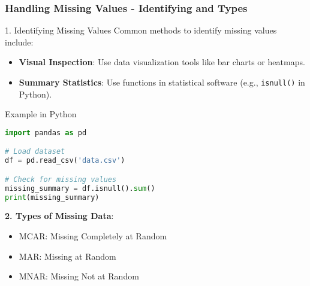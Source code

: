\documentclass[aspectratio=169]{beamer}
\begin{document}
\begin{frame}
    \frametitle{Handling Missing Values - Identifying and Types}
    \begin{block}{1. Identifying Missing Values}
        Common methods to identify missing values include:
        \begin{itemize}
            \item \textbf{Visual Inspection}: Use data visualization tools like bar charts or heatmaps.
            \item \textbf{Summary Statistics}: Use functions in statistical software (e.g., \texttt{isnull()} in Python).
        \end{itemize}
        
        \begin{exampleblock}{Example in Python}
            \begin{lstlisting}[language=Python]
import pandas as pd

# Load dataset
df = pd.read_csv('data.csv')

# Check for missing values
missing_summary = df.isnull().sum()
print(missing_summary)
            \end{lstlisting}
        \end{exampleblock}
        
        \textbf{2. Types of Missing Data}:
        \begin{itemize}
            \item MCAR: Missing Completely at Random
            \item MAR: Missing at Random
            \item MNAR: Missing Not at Random
        \end{itemize}
    \end{block}
\end{frame}
\end{document}
